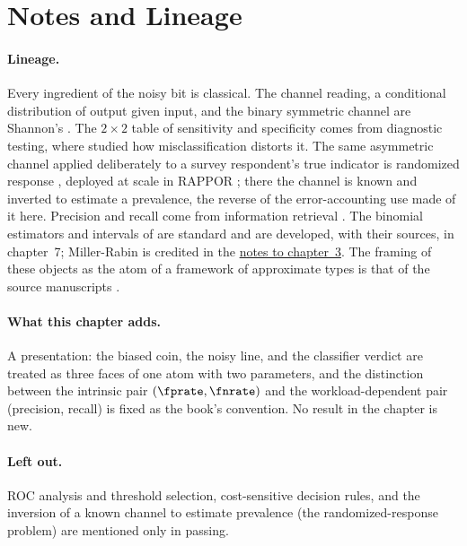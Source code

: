 %

\section{Notes and Lineage}
\label{sec:bib-notes-ch1}

\paragraph{Lineage.}
Every ingredient of the noisy bit is classical. The channel reading, a
conditional distribution of output given input, and the binary symmetric
channel are Shannon's \parencite{shannon-1948}. The $2 \times 2$ table of sensitivity
and specificity comes from diagnostic testing, where \textcite{bross-1954}
studied how misclassification distorts it. The same asymmetric channel applied
deliberately to a survey respondent's true indicator is randomized
response \parencite{warner-1965}, deployed at scale in RAPPOR
\parencite{erlingsson-pihur-korolova-2014}; there the channel is known and
inverted to estimate a prevalence, the reverse of the error-accounting use made
of it here. Precision and recall come from information retrieval
\parencite[Ch.~8]{manning-raghavan-schutze}. The binomial estimators and
intervals of  are standard and are developed, with
their sources, in chapter~7; Miller-Rabin is credited in the
\hyperref[sec:bib-notes-ch3]{notes to chapter~3}. The framing of these objects as the atom of a
framework of approximate types is that of the source manuscripts
\parencite{towell-bernoulli-sets,towell-bernoulli-data-type}.

\paragraph{What this chapter adds.}
A presentation: the biased coin, the noisy line, and the classifier verdict are
treated as three faces of one atom with two parameters, and the distinction
between the intrinsic pair $(\fprate, \fnrate)$ and the workload-dependent pair
(precision, recall) is fixed as the book's convention. No result in the chapter
is new.

\paragraph{Left out.}
ROC analysis and threshold selection, cost-sensitive decision rules, and the
inversion of a known channel to estimate prevalence (the randomized-response
problem) are mentioned only in passing.
